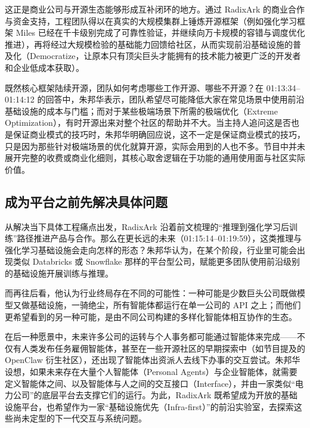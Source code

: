 \documentclass[UTF8,a4paper,11pt,fontset=fandol]{ctexart}
\begin{document}
这正是商业公司与开源生态能够形成互补闭环的地方。通过 RadixArk 的商业合作与资金支持，工程团队得以在真实的大规模集群上锤炼开源框架（例如强化学习框架 Miles 已经在千卡级别完成了可靠性验证，并继续向万卡规模的容错与调度优化推进），再将经过大规模检验的基础能力回馈给社区，从而实现前沿基础设施的普及化（Democratize，让原本只有顶尖巨头才能拥有的技术能力被更广泛的开发者和企业低成本获取）。

既然核心框架陆续开源，团队如何考虑哪些工作开源、哪些不开源？在 01:13:34–01:14:12 的回答中，朱邦华表示，团队希望尽可能降低大家在常见场景中使用前沿基础设施的成本与门槛；而对于某些极端场景下所需的极端优化（Extreme Optimization），有时开源出来对整个社区的帮助并不大。当主持人追问这是否也是保证商业模式的技巧时，朱邦华明确回应说，这不一定是保证商业模式的技巧，只是因为那些针对极端场景的优化就算开源，实际会用到的人也不多。节目中并未展开完整的收费或商业化细则，其核心取舍逻辑在于功能的通用使用面与社区实际价值。

\subsection{成为平台之前先解决具体问题}
从解决当下具体工程痛点出发，RadixArk 沿着前文梳理的“推理到强化学习后训练”路径推进产品与合作。那么在更长远的未来（01:15:14–01:19:59），这类推理与强化学习基础设施会走向怎样的形态？朱邦华认为，在某个阶段，行业里可能会出现类似 Databricks 或 Snowflake 那样的平台型公司，赋能更多团队使用前沿级别的基础设施开展训练与推理。

而再往后看，他认为行业终局存在不同的可能性：一种可能是少数巨头公司既做模型又做基础设施，一骑绝尘，所有智能体都运行在单一公司的 API 之上；而他们更希望看到的另一种可能，是由不同公司构建的多样化智能体相互协作的生态。

在后一种愿景中，未来许多公司的运转与个人事务都可能通过智能体来完成——不仅有人类发布任务雇佣智能体，甚至在一些开源社区的早期探索中（如节目提及的 OpenClaw 衍生社区），还出现了智能体出资派人去线下办事的交互尝试。朱邦华设想，如果未来存在大量个人智能体（Personal Agents）与企业智能体，就需要定义智能体之间、以及智能体与人之间的交互接口（Interface），并由一家类似“电力公司”的底层平台去支撑它们的运行。为此，RadixArk 既希望成为开放的基础设施平台，也希望作为一家“基础设施优先（Infra-first）”的前沿实验室，去探索这些尚未定型的下一代交互与系统问题。
\end{document}
